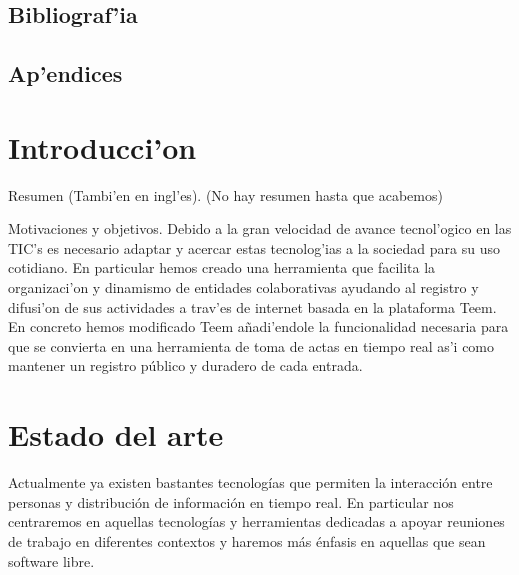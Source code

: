 \documentclass{article}
\begin{document}
	\subsection{Bibliograf'ia}
	\subsection{Ap'endices}
\newpage
\section{Introducci'on}
Resumen (Tambi'en en ingl'es).
(No hay resumen hasta que acabemos)

Motivaciones y objetivos.
Debido a la gran velocidad de avance tecnol'ogico en las TIC's es necesario adaptar y acercar estas tecnolog'ias a la sociedad para su uso cotidiano. En particular hemos creado una herramienta que facilita la organizaci'on y dinamismo de entidades colaborativas ayudando al registro y difusi'on de sus actividades a trav'es de internet basada en la plataforma Teem. En concreto hemos modificado Teem añadi'endole la funcionalidad necesaria para que se convierta en una herramienta de toma de actas en tiempo real as'i como mantener un registro público y duradero de cada entrada.

\section{Estado del arte}
Actualmente ya existen bastantes tecnologías que permiten la interacción entre personas y distribución de información en tiempo real. En particular nos centraremos en aquellas tecnologías y herramientas dedicadas a apoyar reuniones de trabajo en diferentes contextos y haremos más énfasis en aquellas que sean software libre.
\end{document}
